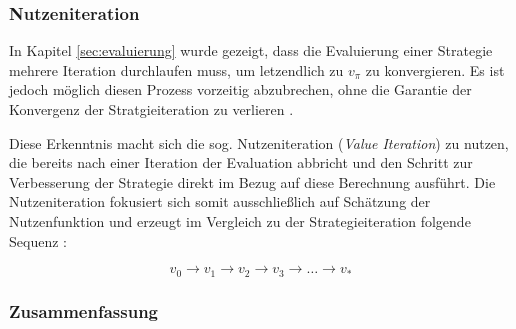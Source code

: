 \subsubsection{Nutzeniteration}\label{sec:Nutzeniteration}
In Kapitel \ref{sec:evaluierung} wurde gezeigt, dass die Evaluierung einer Strategie mehrere Iteration durchlaufen muss, um letzendlich zu $v_\pi$ zu konvergieren. Es ist jedoch möglich diesen Prozess vorzeitig abzubrechen, \glqq ohne die Garantie der Konvergenz der Stratgieiteration zu verlieren\grqq{} \cite[S.~82]{Sutton1998}. 
\par 
Diese Erkenntnis macht sich die sog. Nutzeniteration (\textit{Value Iteration}) zu nutzen, die bereits nach einer Iteration der Evaluation abbricht und den Schritt zur Verbesserung der Strategie direkt im Bezug auf diese Berechnung ausführt. Die Nutzeniteration fokusiert sich somit ausschließlich auf Schätzung der Nutzenfunktion und erzeugt im Vergleich zu der Strategieiteration folgende Sequenz \cite[S.~23]{Wiering}:

\begin{equation}\label{eq:valueItSeq}
    v_0 \rightarrow v_1 \rightarrow v_2 \rightarrow v_3 \rightarrow \dots \rightarrow v_*
\end{equation}

\subsubsection{Zusammenfassung}
